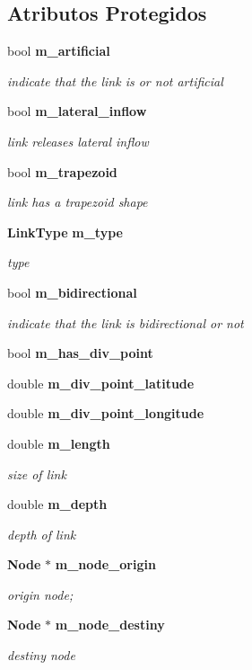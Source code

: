 \subsection*{Atributos Protegidos}
\begin{DoxyCompactItemize}
\item 
bool {\bf m\+\_\+artificial}
\begin{DoxyCompactList}\small\item\em indicate that the link is or not artificial \end{DoxyCompactList}\item 
bool {\bf m\+\_\+lateral\+\_\+inflow}
\begin{DoxyCompactList}\small\item\em link releases lateral inflow \end{DoxyCompactList}\item 
bool {\bf m\+\_\+trapezoid}
\begin{DoxyCompactList}\small\item\em link has a trapezoid shape \end{DoxyCompactList}\item 
{\bf Link\+Type} {\bf m\+\_\+type}
\begin{DoxyCompactList}\small\item\em type \end{DoxyCompactList}\item 
bool {\bf m\+\_\+bidirectional}
\begin{DoxyCompactList}\small\item\em indicate that the link is bidirectional or not \end{DoxyCompactList}\item 
bool {\bf m\+\_\+has\+\_\+div\+\_\+point}
\item 
double {\bf m\+\_\+div\+\_\+point\+\_\+latitude}
\item 
double {\bf m\+\_\+div\+\_\+point\+\_\+longitude}
\item 
double {\bf m\+\_\+length}
\begin{DoxyCompactList}\small\item\em size of link \end{DoxyCompactList}\item 
double {\bf m\+\_\+depth}
\begin{DoxyCompactList}\small\item\em depth of link \end{DoxyCompactList}\item 
{\bf Node} $\ast$ {\bf m\+\_\+node\+\_\+origin}
\begin{DoxyCompactList}\small\item\em origin node; \end{DoxyCompactList}\item 
{\bf Node} $\ast$ {\bf m\+\_\+node\+\_\+destiny}
\begin{DoxyCompactList}\small\item\em destiny node \end{DoxyCompactList}\end{DoxyCompactItemize}
